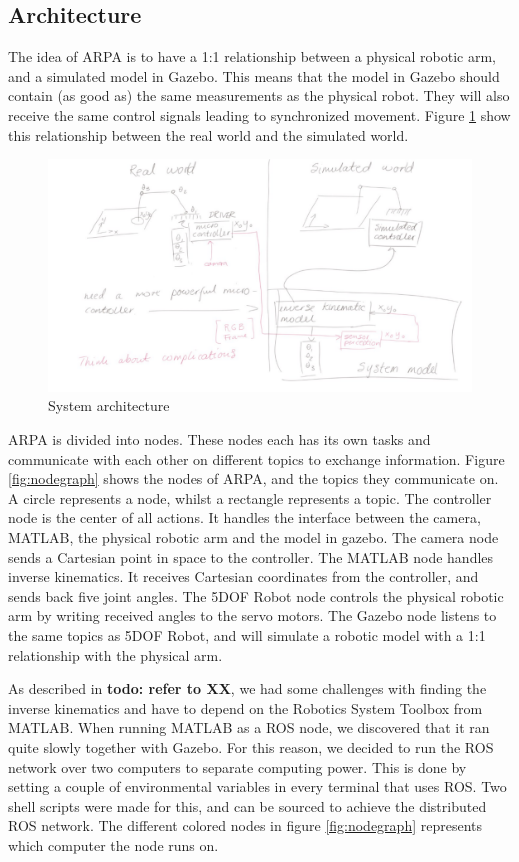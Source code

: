 \documentclass[11pt,a4paper, titlepage]{report}
\begin{document}
	\subsection{Architecture}
	The idea of ARPA is to have a 1:1 relationship between a physical robotic arm, and a simulated model in Gazebo. This means that the model in Gazebo should contain (as good as) the same measurements as the physical robot. They will also receive the same control signals leading to synchronized movement. Figure \ref{fig:architecture} show this relationship between the real world and the simulated world.
	
	\begin{figure}[H]
		\includegraphics[width=\linewidth]{../Diagrams/Architecture.png}
		\caption{System architecture}
		\label{fig:architecture}
	\end{figure}
	
	ARPA is divided into nodes. These nodes each has its own tasks and communicate with each other on different topics to exchange information. Figure \ref{fig:nodegraph} shows the nodes of ARPA, and the topics they communicate on. A circle represents a node, whilst a rectangle represents a topic. The controller node is the center of all actions. It handles the interface between the camera, MATLAB, the physical robotic arm and the model in gazebo. The camera node  sends a Cartesian point in space to the controller. The MATLAB node handles inverse kinematics. It receives Cartesian coordinates from the controller, and sends back five joint angles. The 5DOF Robot node controls the physical robotic arm by writing received angles to the servo motors. The Gazebo node listens to the same topics as 5DOF Robot, and will simulate a robotic model with a 1:1 relationship with the physical arm.
	
As described in \textbf{todo: refer to XX}, we had some challenges with finding the inverse kinematics and have to depend on the Robotics System Toolbox from MATLAB. When running MATLAB as a ROS node, we discovered that it ran quite slowly together with Gazebo. For this reason, we decided to run the ROS network over two computers to separate computing power. This is done by setting a couple of environmental variables in every terminal that uses ROS. Two shell scripts were made for this, and can be sourced to achieve the distributed ROS network. The different colored nodes in figure \ref{fig:nodegraph} represents which computer the node runs on.
\end{document}

